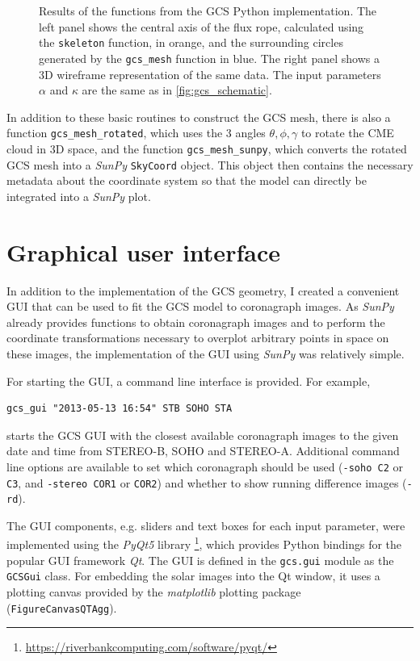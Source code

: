 \begin{figure}
	\centering
	
	\caption[Results of the functions from \acs{GCS}-Python]{Results of the functions from the \ac{GCS} Python implementation. The left panel shows the central axis of the flux rope, calculated using the \texttt{skeleton} function, in orange, and the surrounding circles generated by the \texttt{gcs\_mesh} function in blue. The right panel shows a 3D wireframe representation of the same data. The input parameters $\alpha$ and $\kappa$ are the same as in \autoref{fig:gcs_schematic}.}
	\label{fig:gcs_geometry}
\end{figure}

In addition to these basic routines to construct the \ac{GCS} mesh, there is also a function \verb|gcs_mesh_rotated|, which uses the 3 angles $\theta, \phi, \gamma$ to rotate the \ac{CME} cloud in 3D space, and the function \verb|gcs_mesh_sunpy|, which converts the rotated \ac{GCS} mesh into a \textit{SunPy} \texttt{SkyCoord} object. This object then contains the necessary metadata about the coordinate system so that the model can directly be integrated into a \textit{SunPy} plot.

\section{Graphical user interface}

In addition to the implementation of the \ac{GCS} geometry, I created a convenient \ac{GUI} that can be used to fit the \ac{GCS} model to coronagraph images. As \textit{SunPy} already provides functions to obtain coronagraph images and to perform the coordinate transformations necessary to overplot arbitrary points in space on these images, the implementation of the \ac{GUI} using \textit{SunPy} was relatively simple.

For starting the \ac{GUI}, a command line interface is provided. For example,
\begin{verbatim}
gcs_gui "2013-05-13 16:54" STB SOHO STA
\end{verbatim}
starts the \ac{GCS} \ac{GUI} with the closest available coronagraph images to the given date and time from \ac{STEREO}-B, \ac{SOHO} and \ac{STEREO}-A. Additional command line options are available to set which coronagraph should be used (\texttt{-soho C2} or \texttt{C3}, and \texttt{-stereo COR1} or \texttt{COR2}) and whether to show running difference images (\texttt{-rd}).

The \ac{GUI} components, e.g. sliders and text boxes for each input parameter, were implemented using the \textit{PyQt5} library \footnote{\url{https://riverbankcomputing.com/software/pyqt/}}, which provides Python bindings for the popular \ac{GUI} framework \textit{Qt}. The \ac{GUI} is defined in the \texttt{gcs.gui} module as the \texttt{GCSGui} class. For embedding the solar images into the Qt window, it uses a plotting canvas provided by the \textit{matplotlib} plotting package (\texttt{FigureCanvasQTAgg}).

